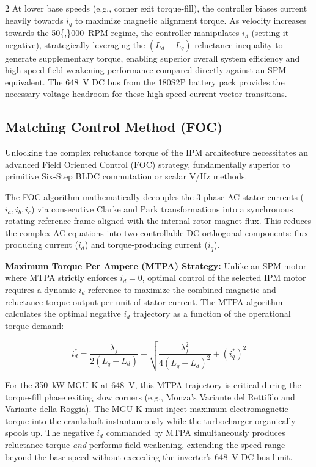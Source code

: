 \begin{multicols}{2}
At lower base speeds (e.g., corner exit torque-fill), the controller biases current heavily towards $i_q$ to maximize magnetic alignment torque. As velocity increases towards the \SI{50{,}000}{RPM} regime, the controller manipulates $i_d$ (setting it negative), strategically leveraging the $(L_d - L_q)$ reluctance inequality to generate supplementary torque, enabling superior overall system efficiency and high-speed field-weakening performance compared directly against an SPM equivalent. The \SI{648}{V} DC bus from the 180S2P battery pack provides the necessary voltage headroom for these high-speed current vector transitions.

\subsection{Matching Control Method (FOC)}

Unlocking the complex reluctance torque of the IPM architecture necessitates an advanced Field Oriented Control (FOC) strategy, fundamentally superior to primitive Six-Step BLDC commutation or scalar V/Hz methods.

The FOC algorithm mathematically decouples the 3-phase AC stator currents ($i_a, i_b, i_c$) via consecutive Clarke and Park transformations into a synchronous rotating reference frame aligned with the internal rotor magnet flux. This reduces the complex AC equations into two controllable DC orthogonal components: flux-producing current ($i_d$) and torque-producing current ($i_q$).

\textbf{Maximum Torque Per Ampere (MTPA) Strategy:}
Unlike an SPM motor where MTPA strictly enforces $i_d = 0$, optimal control of the selected IPM motor requires a dynamic $i_d$ reference to maximize the combined magnetic and reluctance torque output per unit of stator current. The MTPA algorithm calculates the optimal negative $i_d$ trajectory as a function of the operational torque demand:

\begin{equation} \label{eq:ipm_mtpa}
i_d^* = \frac{\lambda_f}{2(L_q - L_d)} - \sqrt{ \frac{\lambda_f^2}{4(L_q - L_d)^2} + (i_q^*)^2 }
\end{equation}

For the \SI{350}{kW} MGU-K at \SI{648}{V}, this MTPA trajectory is critical during the torque-fill phase exiting slow corners (e.g., Monza's Variante del Rettifilo and Variante della Roggia). The MGU-K must inject maximum electromagnetic torque into the crankshaft instantaneously while the turbocharger organically spools up. The negative $i_d$ commanded by MTPA simultaneously produces reluctance torque \emph{and} performs field-weakening, extending the speed range beyond the base speed without exceeding the inverter's \SI{648}{V} DC bus limit.


\end{multicols}
